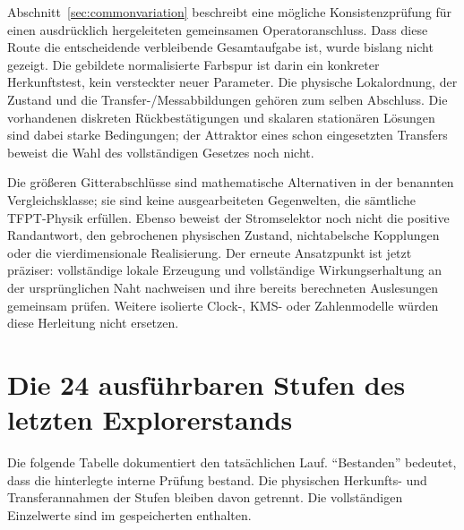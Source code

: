 Abschnitt~\ref{sec:commonvariation} beschreibt eine mögliche Konsistenzprüfung für einen ausdrücklich hergeleiteten gemeinsamen Operatoranschluss. Dass diese Route die entscheidende verbleibende Gesamtaufgabe ist, wurde bislang nicht gezeigt. Die gebildete normalisierte Farbspur ist darin ein konkreter Herkunftstest, kein versteckter neuer Parameter. Die physische Lokalordnung, der Zustand und die Transfer-/Messabbildungen gehören zum selben Abschluss. Die vorhandenen diskreten Rückbestätigungen und skalaren stationären Lösungen sind dabei starke Bedingungen; der Attraktor eines schon eingesetzten Transfers beweist die Wahl des vollständigen Gesetzes noch nicht.

Die größeren Gitterabschlüsse sind mathematische Alternativen in der benannten Vergleichsklasse; sie sind keine ausgearbeiteten Gegenwelten, die sämtliche TFPT-Physik erfüllen. Ebenso beweist der Stromselektor noch nicht die positive Randantwort, den gebrochenen physischen Zustand, nichtabelsche Kopplungen oder die vierdimensionale Realisierung. Der erneute Ansatzpunkt ist jetzt präziser: vollständige lokale Erzeugung und vollständige Wirkungserhaltung an der ursprünglichen Naht nachweisen und ihre bereits berechneten Auslesungen gemeinsam prüfen. Weitere isolierte Clock-, KMS- oder Zahlenmodelle würden diese Herleitung nicht ersetzen.

\appendix
\section{Die 24 ausführbaren Stufen des letzten Explorerstands}\label{app:stages}
Die folgende Tabelle dokumentiert den tatsächlichen Lauf. ``Bestanden'' bedeutet, dass die hinterlegte interne Prüfung bestand. Die physischen Herkunfts- und Transferannahmen der Stufen bleiben davon getrennt. Die vollständigen Einzelwerte sind im gespeicherten  enthalten.

